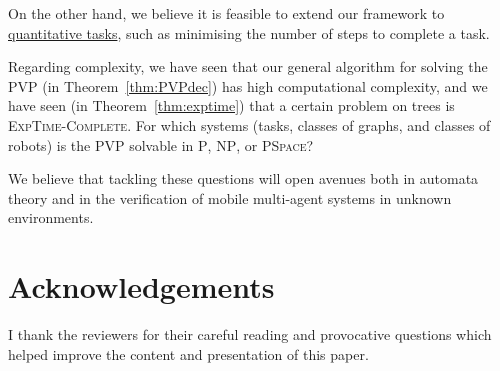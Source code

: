 \documentclass{aamas2015}
\def\exptimeC{\textsc{ExpTime-Complete}}
\def\ptime{\textsc{P}}
\def\np{\textsc{NP}}
\def\pspace{\textsc{PSpace}}
\def\gclass{\mathcal{G}}
\def\nat{\mathbb{N}}
\newcommand{\sr}[1]{\footnote{{\color{red} Note. #1}}}
\begin{document}
On the other hand, we believe it is feasible to extend our framework to \underline{quantitative tasks}, such as minimising the number of steps to complete a task.


Regarding complexity, we have seen that our general algorithm  for solving the PVP (in Theorem~\ref{thm:PVPdec}) has high computational complexity, and we have seen (in Theorem~\ref{thm:exptime}) that a certain problem on trees is \exptimeC. For which systems (tasks, classes of graphs, and classes of robots) is the PVP solvable in \ptime, \np, or \pspace? 

%
We believe that tackling these questions will open avenues both in automata theory and in the verification of mobile multi-agent systems in unknown environments.
%
%
%
%

\section*{Acknowledgements}
I thank the reviewers for their careful reading and provocative questions which helped improve the content and presentation of this paper.



\end{document}
